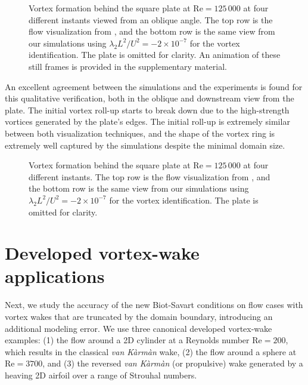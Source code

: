 \documentclass[final,1p,times]{elsarticle}
\begin{document}
\begin{figure}
    \centering
    \def\svgwidth{1\columnwidth}
    
    \caption{Vortex formation behind the square plate at $\text{Re}=125\,000$ at four different instants viewed from an oblique angle. The top row is the flow visualization from \cite{Higuchi1996Three-dimensionalPlates}, and the bottom row is the same view from our simulations using $\lambda_2L^2/U^2=-2\times10^{-7}$ for the vortex identification. The plate is omitted for clarity. An animation of these still frames is provided in the supplementary material.}
    \label{fig:square_disk_comparison_oblique}
\end{figure}
An excellent agreement between the simulations and the experiments is found for this qualitative verification, both in the oblique and downstream view from the plate. The initial vortex roll-up starts to break down due to the high-strength vortices generated by the plate's edges. The initial roll-up is extremely similar between both visualization techniques, and the shape of the vortex ring is extremely well captured by the simulations despite the minimal domain size.
\begin{figure}
    \centering
    \def\svgwidth{1\columnwidth}
    
    \caption{Vortex formation behind the square plate at $\text{Re}=125\,000$ at four different instants. The top row is the flow visualization from \cite{Higuchi1996Three-dimensionalPlates}, and the bottom row is the same view from our simulations using $\lambda_2L^2/U^2=-2\times10^{-7}$ for the vortex identification. The plate is omitted for clarity.}
    \label{fig:square_disk_comparison}
\end{figure}

\section{Developed vortex-wake applications}

Next, we study the accuracy of the new Biot-Savart conditions on flow cases with vortex wakes that are truncated by the domain boundary, introducing an additional modeling error. We use three canonical developed vortex-wake examples: (1) the flow around a 2D cylinder at a Reynolds number $\text{Re}=200$, which results in the classical \emph{van K\`arm\`an} wake, (2) the flow around a sphere at $\text{Re}=3700$, and (3) the reversed \emph{van K\`arm\`an} (or propulsive) wake generated by a heaving 2D airfoil over a range of Strouhal numbers.
\end{document}
